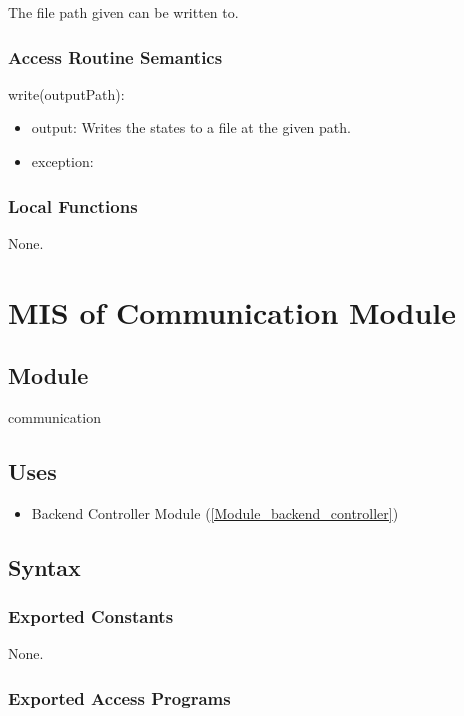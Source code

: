 \documentclass[12pt, titlepage]{article}
\begin{document}
The file path given can be written to.

\subsubsection{Access Routine Semantics}

\noindent write(outputPath):
\begin{itemize}
\item output: Writes the states to a file at the given path.
\item exception:  
\end{itemize}

\subsubsection{Local Functions}

None.

\newpage

\section{MIS of Communication Module} \label{Module_communication}

\subsection{Module}

communication

\subsection{Uses}

\begin{itemize}
  \item Backend Controller Module (\ref{Module_backend_controller})
\end{itemize}

\subsection{Syntax}

\subsubsection{Exported Constants}
None.

\subsubsection{Exported Access Programs}
\end{document}
